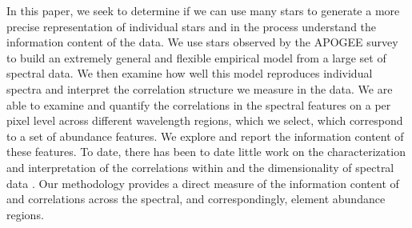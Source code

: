 \documentclass[a4paper,fleqn,usenatbib]{mnras}
\begin{document}


In this paper, we seek to determine if we can use many stars to generate a more precise representation of individual stars and in the process understand the information content of the data. We use stars observed by the APOGEE survey to build an extremely general and flexible empirical model from a large set of spectral data. We then examine how well this model reproduces individual spectra and interpret the correlation structure we measure in the data. We are able to examine and quantify the correlations in the spectral features on a per pixel level across different wavelength regions, which we select, which correspond to a set of abundance features. We explore and report the information content of these features. To date, there has been to date little work on the characterization and interpretation of the correlations within and the dimensionality of spectral data \citep[see however][]{Ting2012, PJ2019, M2014}. Our methodology provides a direct measure of the information content of and correlations across the spectral, and correspondingly, element abundance regions. 
\end{document}
